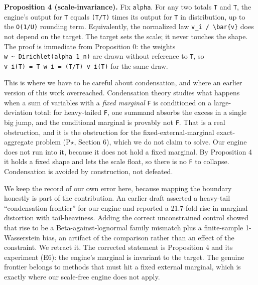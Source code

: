 \textbf{Proposition 4 (scale-invariance).} Fix \texttt{alpha}. For any
two totals \texttt{T} and \texttt{T\textquotesingle{}}, the engine's
output for \texttt{T\textquotesingle{}} equals
\texttt{(T\textquotesingle{}/\allowbreak{}T)} times its output for \texttt{T} in
distribution, up to the \texttt{O(1/\allowbreak{}U)} rounding term. Equivalently, the
normalized law \texttt{v\_\allowbreak{}i\ /\allowbreak{}\ \textbackslash{}bar\{v\}} does not
depend on the target. The target sets the scale; it never touches the
shape. The proof is immediate from Proposition 0: the weights
\texttt{w\ \textasciitilde{}\ Dirichlet(alpha\ 1\_\allowbreak{}n)} are drawn without
reference to \texttt{T}, so
\texttt{v\_\allowbreak{}i(T\textquotesingle{})\ =\ T\textquotesingle{}\ w\_\allowbreak{}i\ =\ (T\textquotesingle{}/\allowbreak{}T)\ v\_\allowbreak{}i(T)}
for the same draw.

This is where we have to be careful about condensation, and where an
earlier version of this work overreached. Condensation theory
\cite{armendariz2011condensation,szavits2014condensation} studies what
happens when a sum of variables with a \emph{fixed marginal} \texttt{F}
is conditioned on a large-deviation total: for heavy-tailed \texttt{F},
one summand absorbs the excess in a single big jump, and the conditional
marginal is provably not \texttt{F}. That is a real obstruction, and it
is the obstruction for the fixed-external-marginal exact-aggregate
problem (P\ensuremath{\star}, Section 6), which we do not claim to
solve. Our engine does not run into it, because it does not hold a fixed
marginal. By Proposition 4 it holds a fixed shape and lets the scale
float, so there is no \texttt{F} to collapse. Condensation is avoided by
construction, not defeated.

We keep the record of our own error here, because mapping the boundary
honestly is part of the contribution. An earlier draft asserted a
heavy-tail ``condensation frontier'' for our engine and reported a
21.7-fold rise in marginal distortion with tail-heaviness. Adding the
correct unconstrained control showed that rise to be a
Beta-against-lognormal family mismatch plus a finite-sample
1-Wasserstein bias, an artifact of the comparison rather than an effect
of the constraint. We retract it. The corrected statement is Proposition
4 and its experiment (E6): the engine's marginal is invariant to the
target. The genuine frontier belongs to methods that must hit a fixed
external marginal, which is exactly where our scale-free engine does not
apply.

